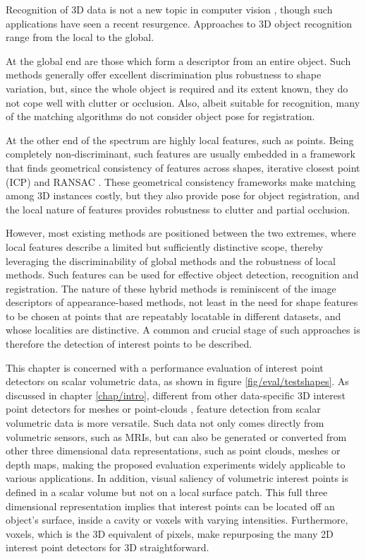 Recognition of 3D data is not a new topic in computer vision \cite{Fisher1987, Nevatia1977, Marr1978, Bolles1983}, though such applications have seen a recent resurgence. Approaches to 3D object recognition range from the local to the global. 

At the global end are those which form a descriptor from an entire object. Such methods generally offer excellent discrimination plus robustness to shape variation, but, since the whole object is required and its extent known, they do not cope well with clutter or occlusion. Also, albeit suitable for recognition, many of the matching algorithms do not consider object pose for registration. 

At the other end of the spectrum are highly local features, such as points. Being completely non-discriminant, such features are usually embedded in a framework that finds geometrical consistency of features across shapes, \eg iterative closest point (ICP) \cite{Besl1992} and RANSAC \cite{Brown2005, Papazov2011}. 
These geometrical consistency frameworks make matching among 3D instances costly, but they also provide pose for object registration, and the local nature of features provides robustness to clutter and partial occlusion. 

However, most existing methods are positioned between the two extremes, where local features describe a limited but sufficiently distinctive scope, thereby leveraging the discriminability of global methods and the robustness of local methods. 
Such features can be used for effective object detection, recognition and registration. The nature of these hybrid methods is reminiscent of the image descriptors of appearance-based methods, not least in the need for shape features to be chosen at points that are repeatably locatable in different datasets, and whose localities are distinctive. 
A common and crucial stage of such approaches is therefore the detection of interest points to be described.  

This chapter is concerned with a performance evaluation of interest point detectors on scalar volumetric data, as shown in figure \ref{fig/eval/testshapes}.   
As discussed in chapter \ref{chap/intro}, different from other data-specific 3D interest point detectors for meshes \cite{Sipiran2011,Glomb2009,Zaharescu2009} or point-clouds \cite{Aanaes2012,Unnikrishnan2008}, feature detection from scalar volumetric data is more versatile. Such data not only comes directly from volumetric sensors, such as MRIs, but can also be generated or converted from other three dimensional data representations, such as point clouds, meshes or depth maps, making the proposed evaluation experiments widely applicable to various applications.
In addition, visual saliency of volumetric interest points is defined in a scalar volume but not on a local surface patch. This full three dimensional representation implies that interest points can be located off an object's surface, \eg inside a cavity or voxels with varying intensities. 
Furthermore, voxels, which is the 3D equivalent of pixels, make repurposing the many 2D interest point detectors for 3D straightforward. 

